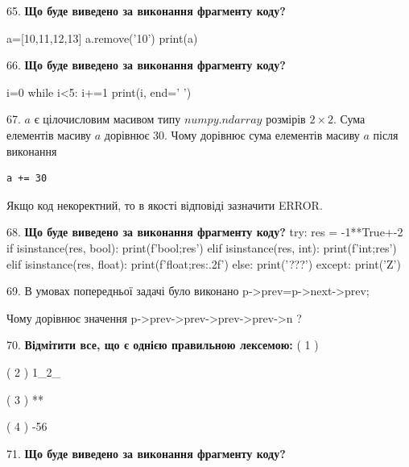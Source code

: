 \documentclass[11pt]{article}
\begin{document}
65. \textbf{Що буде виведено за виконання фрагменту коду?}

a=[10,11,12,13]
a.remove('10')
print(a)

\par\vspace{5mm}

66. \textbf{Що буде виведено за виконання фрагменту коду?}

i=0
while i<5:
    i+=1
print(i, end=' ')

\par\vspace{5mm}

67. 
$a$ є цілочисловим масивом типу $numpy.ndarray$ розмірів $2{\times}2$. Сума елементів масиву $a$ дорівнює 30. Чому дорівнює сума елементів масиву $a$ після виконання 
\begin{verbatim}
a += 30
\end{verbatim}


Якщо код некоректний, то в якості відповіді зазначити ERROR.


\par\vspace{5mm}

68. \textbf{Що буде виведено за виконання фрагменту коду?}
try:
    res = -1**True+-2
    if isinstance(res, bool):
        print(f'bool;{res}')
    elif isinstance(res, int):
        print(f'int;{res}')
    elif isinstance(res, float):
        print(f'float;{res:.2f}')
    else:
        print('???')
except:
    print('Z')
\par\vspace{5mm}

69. 
В умовах попередньої задачі було виконано p->prev=p->next->prev;

Чому дорівнює значення p->prev->prev->prev->prev->n ?\par\vspace{5mm}

70. %
\textbf{Відмітити все, що є однією правильною лексемою:}
( 1 ) %

( 2 ) 1_2_

( 3 ) **

( 4 ) -56
\par\vspace{5mm}

71. \textbf{Що буде виведено за виконання фрагменту коду?}
\end{document}
